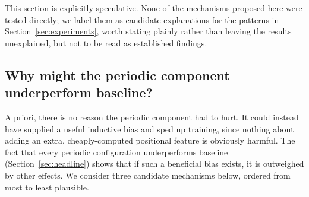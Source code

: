 \documentclass[11pt]{article}
\begin{document}
This section is explicitly speculative. None of the mechanisms proposed here were tested directly; we label them as candidate explanations for the patterns in Section~\ref{sec:experiments}, worth stating plainly rather than leaving the results unexplained, but not to be read as established findings.

\subsection{Why might the periodic component underperform baseline?}

A priori, there is no reason the periodic component had to hurt. It could instead have supplied a useful inductive bias and sped up training, since nothing about adding an extra, cheaply-computed positional feature is obviously harmful. The fact that every periodic configuration underperforms baseline (Section~\ref{sec:headline}) shows that if such a beneficial bias exists, it is outweighed by other effects. We consider three candidate mechanisms below, ordered from most to least plausible.
\end{document}
